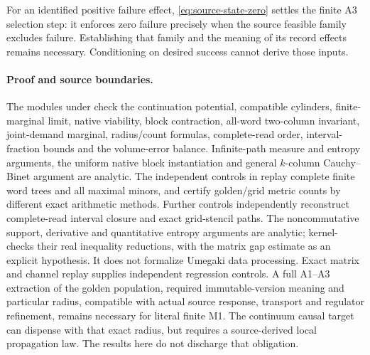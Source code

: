 For an identified positive failure effect, \eqref{eq:source-state-zero}
settles the finite A3 selection step: it enforces zero failure precisely
when the source feasible family excludes failure. Establishing
that family and the meaning of its record effects remains necessary.
Conditioning on desired success cannot derive those inputs.

\paragraph{Proof and source boundaries.}
The modules under 
check the continuation potential, compatible cylinders, finite-marginal
limit, native viability, block contraction, all-word two-column invariant,
joint-demand marginal, radius/count formulas, complete-read order,
interval-fraction bounds and the volume-error balance. Infinite-path measure and
entropy arguments, the uniform native block instantiation and general
$k$-column Cauchy--Binet argument are analytic. The independent controls
in  replay complete finite word
trees and all maximal minors, and certify golden/grid metric counts by
different exact arithmetic methods. Further controls independently
reconstruct complete-read interval closure and exact grid-stencil paths.
The noncommutative support, derivative and quantitative entropy arguments
are analytic;  kernel-checks their real
inequality reductions, with the matrix gap estimate as an explicit
hypothesis. It does not formalize Umegaki data processing. Exact matrix
and channel replay supplies independent regression controls.
A full A1--A3 extraction of the golden
population, required immutable-version meaning and particular radius,
compatible with actual source response, transport and regulator refinement,
remains necessary for literal finite M1. The continuum causal target can
dispense with that exact radius, but requires a source-derived local
propagation law. The results here do not discharge that obligation.
